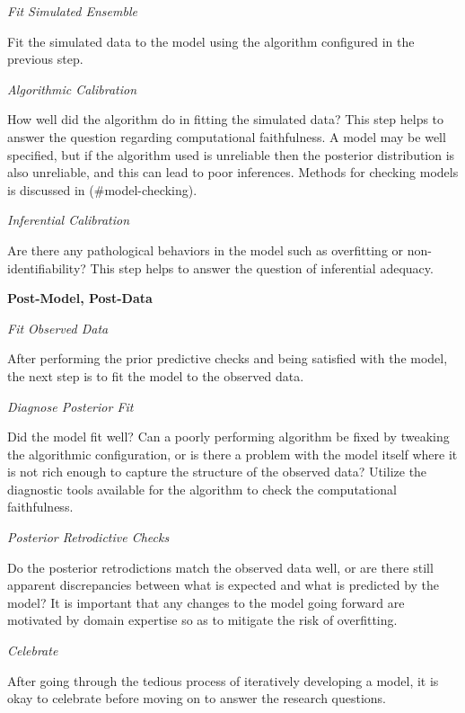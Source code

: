 \documentclass[11pt, oneside, openany]{scrbook}
\begin{document}
\emph{Fit Simulated Ensemble}

Fit the simulated data to the model using the algorithm configured in the previous step.

\emph{Algorithmic Calibration}

How well did the algorithm do in fitting the simulated data? This step helps to answer the question regarding computational faithfulness. A model may be well specified, but if the algorithm used is unreliable then the posterior distribution is also unreliable, and this can lead to poor inferences. Methods for checking models is discussed in (\#model-checking).

\emph{Inferential Calibration}

Are there any pathological behaviors in the model such as overfitting or non-identifiability? This step helps to answer the question of inferential adequacy.

\textbf{Post-Model, Post-Data}

\emph{Fit Observed Data}

After performing the prior predictive checks and being satisfied with the model, the next step is to fit the model to the observed data.

\emph{Diagnose Posterior Fit}

Did the model fit well? Can a poorly performing algorithm be fixed by tweaking the algorithmic configuration, or is there a problem with the model itself where it is not rich enough to capture the structure of the observed data? Utilize the diagnostic tools available for the algorithm to check the computational faithfulness.

\emph{Posterior Retrodictive Checks}

Do the posterior retrodictions match the observed data well, or are there still apparent discrepancies between what is expected and what is predicted by the model? It is important that any changes to the model going forward are motivated by domain expertise so as to mitigate the risk of overfitting.

\emph{Celebrate}

After going through the tedious process of iteratively developing a model, it is okay to celebrate before moving on to answer the research questions.
\end{document}

